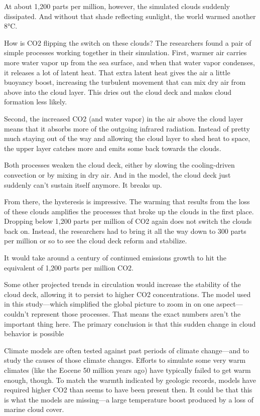 \documentclass[
]{book}
\begin{document}
At about 1,200 parts per million, however, the simulated clouds suddenly dissipated. And without that shade reflecting sunlight, the world warmed another 8°C.

How is CO2 flipping the switch on these clouds? The researchers found a pair of simple processes working together in their simulation. First, warmer air carries more water vapor up from the sea surface, and when that water vapor condenses, it releases a lot of latent heat. That extra latent heat gives the air a little buoyancy boost, increasing the turbulent movement that can mix dry air from above into the cloud layer. This dries out the cloud deck and makes cloud formation less likely.

Second, the increased CO2 (and water vapor) in the air above the cloud layer means that it absorbs more of the outgoing infrared radiation. Instead of pretty much staying out of the way and allowing the cloud layer to shed heat to space, the upper layer catches more and emits some back towards the clouds.

Both processes weaken the cloud deck, either by slowing the cooling-driven convection or by mixing in dry air. And in the model, the cloud deck just suddenly can't sustain itself anymore. It breaks up.

From there, the hysteresis is impressive. The warming that results from the loss of these clouds amplifies the processes that broke up the clouds in the first place. Dropping below 1,200 parts per million of CO2 again does not switch the clouds back on. Instead, the researchers had to bring it all the way down to 300 parts per million or so to see the cloud deck reform and stabilize.

It would take around a century of continued emissions growth to hit the equivalent of 1,200 parts per million CO2.

Some other projected trends in circulation would increase the stability of the cloud deck, allowing it to persist to higher CO2 concentrations. The model used in this study---which simplified the global picture to zoom in on one aspect---couldn't represent those processes. That means the exact numbers aren't the important thing here. The primary conclusion is that this sudden change in cloud behavior is possible

Climate models are often tested against past periods of climate change---and to study the causes of those climate changes. Efforts to simulate some very warm climates (like the Eocene 50 million years ago) have typically failed to get warm enough, though. To match the warmth indicated by geologic records, models have required higher CO2 than seems to have been present then. It could be that this is what the models are missing---a large temperature boost produced by a loss of marine cloud cover.
\end{document}
